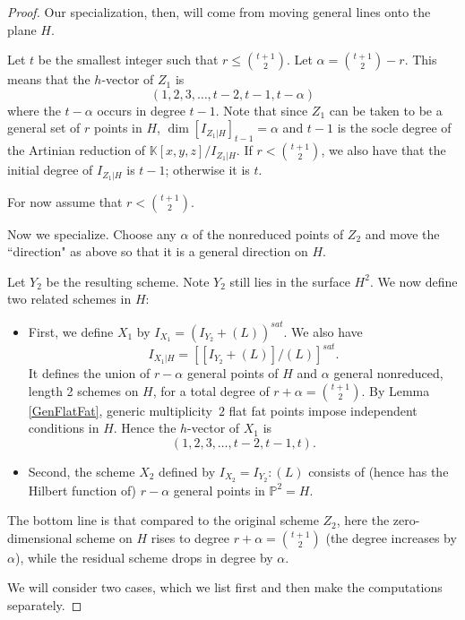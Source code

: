 \documentclass[12pt]{amsart}%
\numberwithin{equation}{section}
\theoremstyle{definition}
\numberwithin{equation}{section}
\newcommand{\PP}{ \ensuremath{\mathbb{P}}}
\begin{document}
\begin{proof}
Our specialization, then, will come from moving general lines onto the plane $H$.






Let $t$ be the smallest integer such that $r \leq \binom{t+1}{2}$. Let $\alpha = \binom{t+1}{2} - r$. 
This means that the $h$-vector of $Z_1$ is
\[
(1,2,3,\dots, t-2, t-1, t-\alpha)
\]
where the $t-\alpha$ occurs in degree $t-1$. 
Note that since $Z_1$ can be taken to be a general set of $r$ points in $H$, $\dim [I_{Z_1 |H}]_{t-1} = \alpha$ and $t-1$ is the socle degree of the Artinian reduction of $\mathbb{K}[x,y,z]/I_{Z_1|H}$. If $r < \binom{t+1}{2}$, we also have that the initial degree of $I_{Z_1|H}$ is $t-1$; otherwise it is $t$.

For now assume that $r < \binom{t+1}{2}$.

Now we specialize. Choose any $\alpha$ of the nonreduced points of $Z_2$ and move the ``direction" as above so that it is a general direction on $H$. 


Let $Y_2$ be the resulting scheme. Note $Y_2$ still lies in the surface $H^2$. 
We now define two related schemes in $H$:

\begin{itemize}
    \item First, we define $X_1$ by 
    $I_{X_1} = ( I_{Y_2} + (L))^{sat}$. We also have
    \[
    I_{X_1|H} = [[I_{Y_2} + (L)]/(L)]^{sat}.
    \]
It defines the union of  $r-\alpha$ general points of $H$ and $\alpha$ general nonreduced, length 2 schemes on $H$, for a total degree of $r+\alpha = \binom{t+1}{2}$.
    By Lemma \ref{GenFlatFat}, generic multiplicity~$2$ flat fat points impose independent conditions in $H$.  Hence the $h$-vector of $X_1$ is
    \[
(1,2,3,\dots, t-2, t-1, t).
\] 


    \item Second, the scheme $X_2$ defined by $I_{X_2} = I_{Y_2} : (L)$ consists of (hence has the Hilbert function of) $r-\alpha$ general points in  $\PP^2 = H$.

\end{itemize}

\noindent The bottom line is that compared to the original scheme $Z_2$, here the zero-dimensional scheme on $H$ rises to degree $r+\alpha = \binom{t+1}{2}$ (the degree increases by $\alpha$), while the residual scheme drops in degree by $\alpha$. 

We will consider two cases, which we list first and then make the computations separately.


\end{proof}
\end{document}
